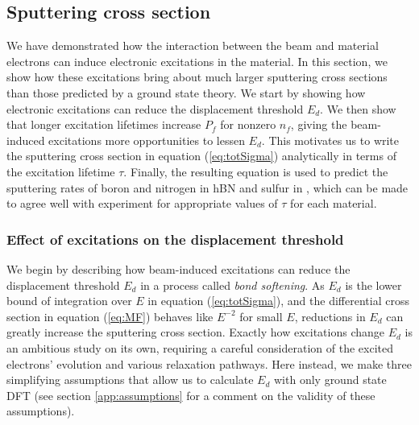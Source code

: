 \documentclass[twoside,twocolumn,9pt]{article}
\begin{document}
\subsection{Sputtering cross section}
\label{sec:sputtering}

We have demonstrated how the interaction between the beam and material
electrons can induce electronic excitations in the material.
In this section, we show how these excitations bring about much larger
sputtering cross sections than those predicted by a ground state theory.
We start by showing how electronic excitations can reduce the displacement
threshold $E_d$.
We then show that longer excitation lifetimes increase $P_f$ for nonzero $n_f$,
giving the beam-induced excitations more opportunities to lessen $E_d$.
This motivates us to write the sputtering cross section in equation
(\ref{eq:totSigma}) analytically in terms of the excitation lifetime $\tau$.
Finally, the resulting equation is used to predict the sputtering rates of
boron and nitrogen in hBN and sulfur in , which can be made to agree
well with experiment for appropriate values of $\tau$ for each material.

\subsubsection{Effect of excitations on the displacement threshold}
\label{sec:assumptions}

We begin by describing how beam-induced excitations can reduce the
displacement threshold $E_d$ in a process called \textit{bond softening}.
As $E_d$ is the lower bound of integration over $E$ in equation
(\ref{eq:totSigma}), and the differential cross section in equation
(\ref{eq:MF}) behaves like $E^{-2}$ for small $E$, reductions in $E_d$ can
greatly increase the sputtering cross section.
Exactly how excitations change $E_d$ is an ambitious study on its own,
requiring a careful consideration of the excited electrons' evolution and
various relaxation pathways.\cite{Lingerfelt2019a}
Here instead, we make three simplifying assumptions that allow us to calculate
$E_d$ with only ground state DFT (see section \ref{app:assumptions} for a
comment on the validity of these assumptions).
\end{document}
